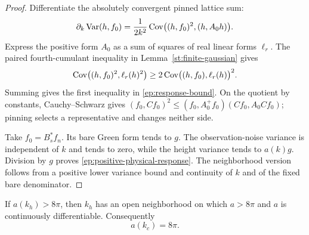 \begin{proof}
Differentiate the absolutely convergent pinned lattice sum:
\[
 \partial_k\operatorname{Var}(h,f_0)
  =\frac1{2k^2}\operatorname{Cov}\bigl((h,f_0)^2,(h,A_0h)\bigr).
\]
Express the positive form $A_0$ as a sum of squares of real
linear forms $\ell_r$.  The paired fourth-cumulant inequality
in Lemma~\ref{st:finite-gaussian} gives
\[
 \operatorname{Cov}\bigl((h,f_0)^2,\ell_r(h)^2\bigr)
 \ge 2\operatorname{Cov}\bigl((h,f_0),\ell_r(h)\bigr)^2.
\]
Summing gives the first inequality in
\eqref{ep:response-bound}.  On the quotient by constants,
Cauchy--Schwarz gives
$(f_0,Cf_0)^2\le(f_0,A_0^+f_0)(Cf_0,A_0Cf_0)$;
pinning selects a representative and changes neither side.

Take $f_0=B_s^*f_n$.  Its bare Green form tends to $g$.
The observation-noise variance is independent of $k$ and
tends to zero, while the height variance tends to $a(k)g$.
Division by $g$ proves
\eqref{ep:positive-physical-response}.  The neighborhood
version follows from a positive lower variance bound and
continuity of $k$ and of the fixed bare denominator.
\end{proof}

\begin{proposition}
\label{ep:supermarginal}
If $a(k_h)>8\pi$, then $k_h$ has an open neighborhood on
which $a>8\pi$ and $a$ is continuously differentiable.
Consequently
\begin{equation}\label{ep:endpoint-value}
 a(k_c)=8\pi .
\end{equation}
\end{proposition}

